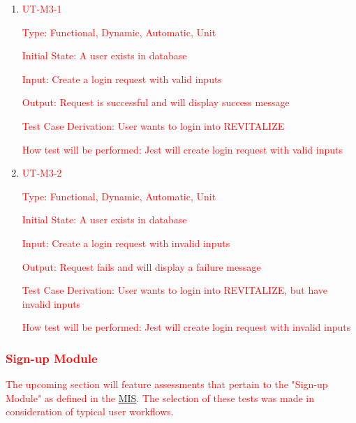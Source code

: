 \documentclass[12pt, titlepage]{article}
\begin{document}
\begin{enumerate}

	\item{\textcolor{red}{UT-M3-1\\}}

	\textcolor{red}{Type: Functional, Dynamic, Automatic, Unit}

	\textcolor{red}{Initial State: A user exists in database}

	\textcolor{red}{Input: Create a login request with valid inputs}

	\textcolor{red}{Output: Request is successful and will display success message}

	\textcolor{red}{Test Case Derivation: User wants to login into REVITALIZE}

	\textcolor{red}{How test will be performed: Jest will create login request with valid inputs}

	\item{\textcolor{red}{UT-M3-2\\}}

	\textcolor{red}{Type: Functional, Dynamic, Automatic, Unit}

	\textcolor{red}{Initial State: A user exists in database}

	\textcolor{red}{Input: Create a login request with invalid inputs}

	\textcolor{red}{Output: Request fails and will display a failure message}

	\textcolor{red}{Test Case Derivation: User wants to login into REVITALIZE, but have invalid inputs}

	\textcolor{red}{How test will be performed: Jest will create login request with invalid inputs}

\end{enumerate}

\subsubsection{\textcolor{red}{Sign-up Module}}

\textcolor{red}{The upcoming section will feature assessments that pertain to the "Sign-up Module" as defined in the \href{https://github.com/BillNguyen1999/REVITALIZE/blob/main/docs/Design/SoftDetailedDes/MIS.pdf}{\color{blue}MIS}. The selection of these tests was made in consideration of typical user workflows.}
\end{document}
